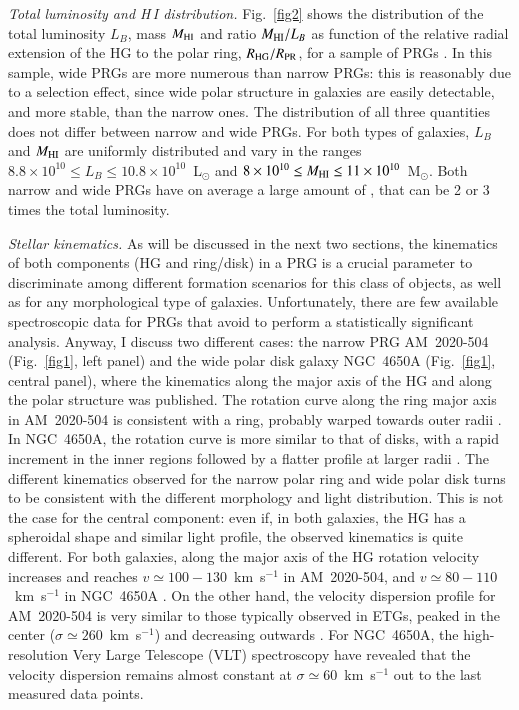 \documentclass[11pt,twoside]{article}
\begin{document}
{\it Total luminosity and H\,I distribution.\/} Fig.~\ref{fig2} shows
the distribution of the total luminosity $L_B$,  mass
$M_{\rm HI}$ and ratio $M_{\rm HI}/L_B$ as function of the relative
radial extension of the HG to the polar ring, $R_{\rm HG}/R_{\rm PR}$,
for a sample of PRGs \citep{vanDriel2000, vanDriel2002}.  In this
sample, wide PRGs are more numerous than narrow PRGs: this is
reasonably due to a selection effect, since wide polar structure in
galaxies are easily detectable, and more stable, than the narrow ones.
The distribution of all three quantities does not differ between
narrow and wide PRGs. For both types of galaxies, $L_B$ and $M_{\rm
HI}$ are uniformly distributed and vary in the ranges $8.8 \times
10^{10} \le L_B \le 10.8 \times 10^{10}$~L$_\odot$ and $8 \times
10^{10} \le M_{\rm HI} \le 11 \times 10^{10}$~M$_\odot$. Both narrow
and wide PRGs have on average a large amount of , that can
be 2 or 3 times the total luminosity.
 
{\it Stellar kinematics.\/} As will be discussed in the next two
sections, the kinematics of both components (HG and ring/disk) in a
PRG is a crucial parameter to discriminate among different formation
scenarios for this class of objects, as well as for any morphological
type of galaxies. Unfortunately, there are few available spectroscopic
data for PRGs that avoid to perform a statistically significant
analysis. Anyway, I discuss two different cases: the narrow PRG
AM~2020-504 (Fig.~\ref{fig1}, left panel) and the wide polar disk
galaxy NGC~4650A (Fig.~\ref{fig1}, central panel), where the
kinematics along the major axis of the HG and along the polar
structure was published.  The rotation curve along the ring major axis
in AM~2020-504 is consistent with a ring, probably warped towards
outer radii \citep{Arnaboldi1993,Freitas}. In NGC~4650A, the rotation
curve is more similar to that of disks, with a rapid increment in the
inner regions followed by a flatter profile at larger
radii \citep{Swaters2003}. The different kinematics observed for the
narrow polar ring and wide polar disk turns to be consistent with the
different morphology and light distribution.  This is not the case for
the central component: even if, in both galaxies, the HG has a
spheroidal shape and similar light profile, the observed kinematics is
quite different. For both galaxies, along the major axis of the HG
rotation velocity increases and reaches $v\simeq100-130$~km~s$^{-1}$
in AM~2020-504, and $v\simeq80-110$~km~s$^{-1}$ in
NGC~4650A \citep{Arnaboldi1993, Iodice2006}. On the other hand, the
velocity dispersion profile for AM~2020-504 is very similar to those
typically observed in ETGs, peaked in the center ($\sigma \simeq
260$~km~s$^{-1}$) and decreasing outwards \citep[$\sigma \simeq
100$~km~s$^{-1}$,][]{Arnaboldi1993}. For NGC~4650A, the
high-resolution Very Large Telescope (VLT)
spectroscopy \citep{Iodice2006} have revealed that the velocity
dispersion remains almost constant at $\sigma \simeq 60$~km~s$^{-1}$
out to the last measured data points.
\end{document}
